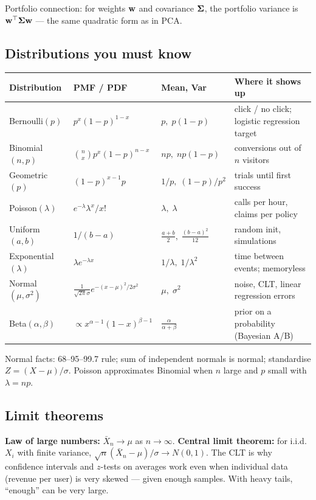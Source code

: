 Portfolio connection: for weights $\mathbf{w}$ and covariance $\bm{\Sigma}$, the portfolio variance is $\mathbf{w}^\top\bm{\Sigma}\mathbf{w}$ --- the same quadratic form as in PCA.

\subsection{Distributions you must know}
\begin{longtable}{@{}p{}p{}p{}p{}@{}}
\toprule
Distribution & PMF / PDF & Mean, Var & Where it shows up\\
\midrule
Bernoulli$(p)$ & $p^x(1-p)^{1-x}$ & $p,\;p(1-p)$ & click / no click; logistic regression target\\
Binomial$(n,p)$ & $\binom nx p^x(1-p)^{n-x}$ & $np,\;np(1-p)$ & conversions out of $n$ visitors\\
Geometric$(p)$ & $(1-p)^{x-1}p$ & $1/p,\;(1-p)/p^2$ & trials until first success\\
Poisson$(\lambda)$ & $e^{-\lambda}\lambda^x/x!$ & $\lambda,\;\lambda$ & calls per hour, claims per policy\\
Uniform$(a,b)$ & $1/(b-a)$ & $\frac{a+b}2,\;\frac{(b-a)^2}{12}$ & random init, simulations\\
Exponential$(\lambda)$ & $\lambda e^{-\lambda x}$ & $1/\lambda,\;1/\lambda^2$ & time between events; memoryless\\
Normal$(\mu,\sigma^2)$ & $\frac1{\sqrt{2\pi}\sigma}e^{-(x-\mu)^2/2\sigma^2}$ & $\mu,\;\sigma^2$ & noise, CLT, linear regression errors\\
Beta$(\alpha,\beta)$ & $\propto x^{\alpha-1}(1-x)^{\beta-1}$ & $\frac{\alpha}{\alpha+\beta}$ & prior on a probability (Bayesian A/B)\\
\bottomrule
\end{longtable}

Normal facts: 68--95--99.7 rule; sum of independent normals is normal; standardise $Z=(X-\mu)/\sigma$. Poisson approximates Binomial when $n$ large and $p$ small with $\lambda=np$.

\subsection{Limit theorems}
\textbf{Law of large numbers:} $\bar X_n\to\mu$ as $n\to\infty$. \textbf{Central limit theorem:} for i.i.d.\ $X_i$ with finite variance, $\sqrt n(\bar X_n-\mu)/\sigma\to N(0,1)$. The CLT is why confidence intervals and $z$-tests on averages work even when individual data (revenue per user) is very skewed --- given enough samples. With heavy tails, ``enough'' can be very large.

